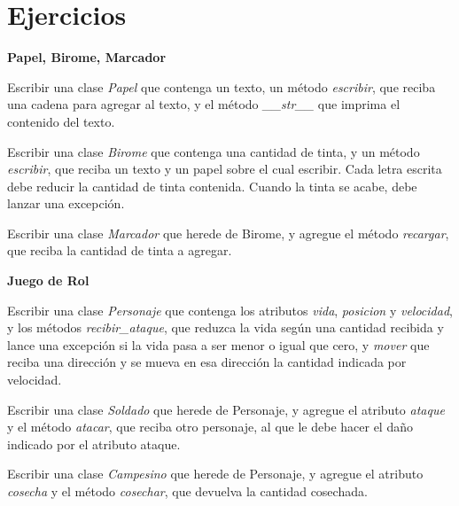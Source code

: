 \newpage
\section{Ejercicios}

\begin{ejercicio}
{\bf Papel, Birome, Marcador}
\begin{partes}
    \item Escribir una clase {\it Papel} que contenga un texto, un método {\it
escribir}, que reciba una cadena para agregar al texto, y el método {\it
\_\_str\_\_} que imprima el contenido del texto.
    \item Escribir una clase {\it Birome} que contenga una cantidad de tinta, y
un método {\it escribir}, que reciba un texto y un papel sobre el cual
escribir. Cada letra escrita debe reducir la cantidad de tinta contenida.
Cuando la tinta se acabe, debe lanzar una excepción.
    \item Escribir una clase {\it Marcador} que herede de Birome, y agregue el
método {\it recargar}, que reciba la cantidad de tinta a agregar.
\end{partes}
\end{ejercicio}


\begin{ejercicio}
{\bf Juego de Rol}
\begin{partes}
    \item Escribir una clase {\it Personaje} que contenga los atributos {\it
vida}, {\it posicion} y {\it velocidad}, y los métodos {\it
recibir\_ataque}, que reduzca la vida según una cantidad recibida y lance
una excepción si la vida pasa a ser menor o igual que cero, y {\it
mover} que reciba una dirección y se mueva en esa dirección la cantidad
indicada por velocidad.
    \item Escribir una clase {\it Soldado} que herede de Personaje, y agregue
el atributo {\it ataque} y el método {\it atacar}, que reciba otro
personaje, al que le debe hacer el daño indicado por el atributo ataque.
    \item Escribir una clase {\it Campesino} que herede de Personaje, y agregue
el atributo {\it cosecha} y el método {\it cosechar}, que devuelva la
cantidad cosechada.
\end{partes}
\end{ejercicio}


